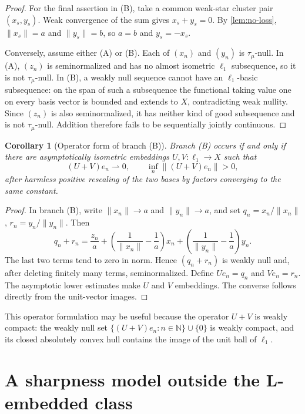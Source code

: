 \documentclass[11pt]{article}
\newtheorem{corollary}[theorem]{Corollary}
\theoremstyle{definition}
\theoremstyle{remark}
\newcommand{\N}{\mathbb N}
\newcommand{\ellone}{\ell_1}
\newcommand{\taumu}{\tau_\mu}
\begin{document}
\begin{proof}
For the final assertion in (B), take a common weak-star cluster pair
$(x_s,y_s)$.  Weak convergence of the sum gives $x_s+y_s=0$.  By
\cref{lem:no-loss}, $\|x_s\|=a$ and $\|y_s\|=b$, so $a=b$ and
$y_s=-x_s$.

Conversely, assume either (A) or (B).  Each of $(x_n)$ and $(y_n)$ is
$\taumu$-null.  In (A), $(z_n)$ is seminormalized and has no almost
isometric $\ellone$ subsequence, so it is not $\taumu$-null.  In (B), a
weakly null sequence cannot have an $\ellone$-basic subsequence: on the span
of such a subsequence the functional taking value one on every basis vector
is bounded and extends to $X$, contradicting weak nullity.  Since $(z_n)$ is
also seminormalized, it has neither kind of good subsequence and is not
$\taumu$-null.  Addition therefore fails to be sequentially jointly
continuous.
\end{proof}

\begin{corollary}[Operator form of branch (B)]
Branch \textup{(B)} occurs if and only if there are asymptotically isometric
embeddings $U,V:\ellone\to X$ such that
\[
       (U+V)e_n \rightharpoonup 0,
       \qquad \inf_n\|(U+V)e_n\|>0,
\]
after harmless positive rescaling of the two bases by factors converging to
the same constant.
\end{corollary}

\begin{proof}
In branch (B), write $\|x_n\|\to a$ and $\|y_n\|\to a$, and set
$q_n=x_n/\|x_n\|$, $r_n=y_n/\|y_n\|$.  Then
\[
 q_n+r_n=\frac{z_n}{a}
 +\left(\frac{1}{\|x_n\|}-\frac1a\right)x_n
 +\left(\frac{1}{\|y_n\|}-\frac1a\right)y_n.
\]
The last two terms tend to zero in norm.  Hence $(q_n+r_n)$ is weakly null
and, after deleting finitely many terms, seminormalized.  Define
$Ue_n=q_n$ and $Ve_n=r_n$.  The asymptotic lower estimates make $U$ and
$V$ embeddings.  The converse follows directly from the unit-vector images.
\end{proof}

This operator formulation may be useful because the operator $U+V$ is weakly
compact: the weakly null set
$\{(U+V)e_n:n\in\N\}\cup\{0\}$ is weakly compact, and its closed absolutely
convex hull contains the image of the unit ball of $\ellone$.

\section{A sharpness model outside the L-embedded class}
\end{document}
